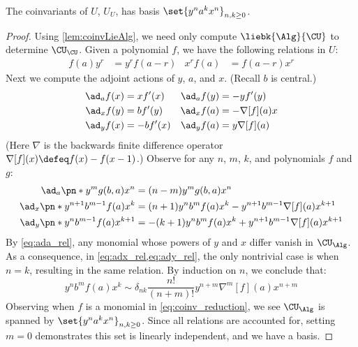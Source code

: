 \begin{theorem}
        The coinvariants of $U$, $U_U$, has basis
        $\set{y^n a^k x^n}_{n, k\ge 0}$.
\end{theorem}
\begin{proof}
Using \cref{lem:coinvLieAlg}, we need only compute $\liebk{\Alg}{\CU}$ to
determine $\CU_\CU$. Given a polynomial $f$, we have the
following relations in $U$:
\begin{align}
        f(a)y^r &= y^rf(a-r) &
        x^rf(a) &= f(a-r)x^r
\end{align}
Next we compute the adjoint actions of $y$, $a$, and $x$. (Recall $b$ is
central.)
\begin{align}
  \ad_a f(x) &= xf'(x)&
  \ad_a f(y) &= -yf'(y)\label{eq:ada}\\
  \ad_x f(y) &= bf'(y) &
  \ad_x f(a) &= -\nabla[f](a)x\label{eq:adx}\\
  \ad_y f(x) &= -bf'(x) &
  \ad_y f(a) &= y\nabla[f](a)\label{eq:ady}
\end{align}
(Here $\nabla$ is the backwards finite difference operator $\nabla[f](x) \defeq
f(x) - f(x-1)$.) Observe for any $n$, $m$, $k$, and polynomials $f$ and $g$:
\begin{align}
        \ad_a \pn*{y^m g(b, a) x^n } &= (n-m)y^mg(b, a) x^n
        \label{eq:ada_rel}\\
        \ad_{x}\pn*{y^{n+1}b^{m-1}f(a)x^{k}} &=
                (n+1)y^{n}b^{m}f(a)x^{k} - y^{n+1}b^{m-1}\nabla[f](a)x^{k+1}
        \label{eq:adx_rel}\\
        \ad_{y}\pn*{y^n b^{m-1} f(a) x^{k+1}} &=
                - (k+1)y^n b^m f(a) x^k + y^{n+1} b^{m-1} \nabla[f](a)x^{k+1}
        \label{eq:ady_rel}
\end{align}
By \cref{eq:ada_rel}, any monomial whose powers of $y$ and $x$ differ vanish in
$\CU_{\Alg}$. As a consequence, in \cref{eq:adx_rel,eq:ady_rel}, the only
nontrivial case is when $n=k$, resulting in the same relation. By induction on
$n$, we conclude that:
\begin{equation}\label{eq:coinv_reduction}
        y^n b^m f(a) x^k \sim δ_{nk}\frac{n!}{(n+m)!}y^{n+m}\nabla^m[f](a)x^{n+m}
\end{equation}
Observing when $f$ is a monomial in \cref{eq:coinv_reduction}, we see
$\CU_{\Alg}$ is spanned by $\set{y^n a^k x^n}_{n, k \ge 0}$. Since all relations are
accounted for, setting $m=0$  demonstrates this set is linearly independent, and
we have a basis.
\end{proof}

